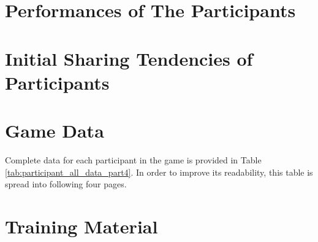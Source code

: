 \begin{table}[h]
    \centering
    \caption{Profiles and the distribution of their declared level of sharing frequency. Standard deviations for the averages are given in the parentheses.}
    \label{tab:profiles_and_sharing_frequency}
\end{table}

\clearpage


\section{Performances of The Participants}\label{sec:participant_performances}



\clearpage

\section{Initial Sharing Tendencies of Participants}\label{sec:tendencies_all_emojis}




\section{Game Data}\label{sec:all_simulation_data}

Complete data for each participant in the game is provided in Table \ref{tab:participant_all_data_part4}. In order to improve its readability, this table is spread into following four pages.



\section{Training Material}\label{sec:training_material}



